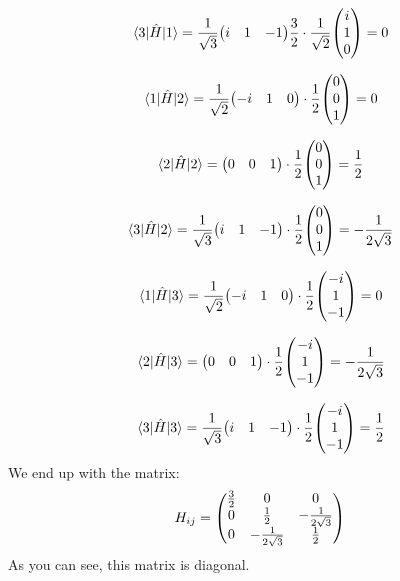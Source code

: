 \documentclass{scrartcl}
\begin{document}
$$\mel*{3}{\hat{H}}{1}=\frac{1}{\sqrt{3}}\mqty(i & 1 & -1)\frac{3}{2}\cdot\frac{1}{\sqrt{2}}\mqty(i \\ 1 \\ 0) = 0$$

$$\mel*{1}{\hat{H}}{2}=\frac{1}{\sqrt{2}}\mqty(-i & 1 & 0)\cdot\frac{1}{2}\mqty(0 \\ 0 \\ 1) = 0$$

$$\mel*{2}{\hat{H}}{2}=\mqty(0 & 0 & 1)\cdot\frac{1}{2}\mqty(0 \\ 0 \\ 1)=\frac{1}{2}$$

$$\mel*{3}{\hat{H}}{2}=\frac{1}{\sqrt{3}}\mqty(i & 1 & -1)\cdot\frac{1}{2}\mqty(0 \\ 0 \\ 1)=-\frac{1}{2\sqrt{3}}$$

$$\mel*{1}{\hat{H}}{3}=\frac{1}{\sqrt{2}}\mqty(-i & 1 & 0)\cdot\frac{1}{2}\mqty(-i \\ 1 \\ -1) = 0$$

$$\mel*{2}{\hat{H}}{3}=\mqty(0 & 0 & 1)\cdot\frac{1}{2}\mqty(-i \\ 1 \\ -1)=-\frac{1}{2\sqrt{3}}$$

$$\mel*{3}{\hat{H}}{3}=\frac{1}{\sqrt{3}}\mqty(i & 1 & -1)\cdot\frac{1}{2}\mqty(-i \\ 1 \\ -1)=\frac{1}{2}$$
We end up with the matrix:
$$H_{ij}=\mqty(\frac{3}{2} & 0 & 0 \\ 0 & \frac{1}{2} & -\frac{1}{2\sqrt{3}} \\ 0 & -\frac{1}{2\sqrt{3}} & \frac{1}{2})$$
As you can see, this matrix is diagonal.
\end{document}
